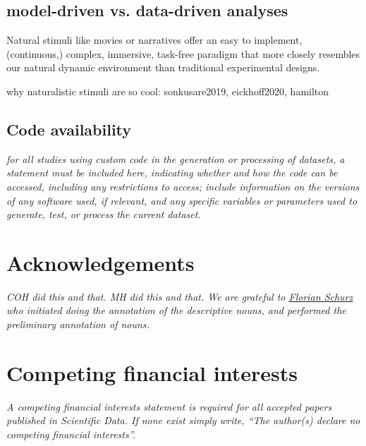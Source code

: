 \documentclass[english]{article}
\begin{document}
\subsection{model-driven vs. data-driven analyses}
Natural stimuli like movies \citep{hasson2008neurocinematics,
sonkusare2019naturalistic} or narratives \citep{honey2012not,
lerner2011topographic, silbert2014coupled} offer an easy to implement,
(continuous,) complex, immersive, task-free paradigm that more closely resembles
our natural dynamic environment than traditional experimental designs.

why naturalistic stimuli are so cool: sonkusare2019, eickhoff2020, hamilton


\subsection*{Code availability}
 \emph{for all studies using
    custom code in the generation or processing of datasets, a statement must be
    included here, indicating whether and how the code can be accessed,
including any restrictions to access; include information on the versions of any
software used, if relevant, and any specific variables or parameters used to
generate, test, or process the current dataset. }

\section*{Acknowledgements}
\emph{COH did this and that.
MH did this and that.
We are grateful to \href{www.florianschurz.de}{Florian Schurz} who initiated doing the annotation of the descriptive nouns, and performed the preliminary annotation of nouns.}

\section*{Competing financial interests}
\emph{A competing financial interests statement is required for all accepted
papers published in \emph{Scientific Data}. If none exist simply write,
``The author(s) declare no competing financial interests''.}
\end{document}
